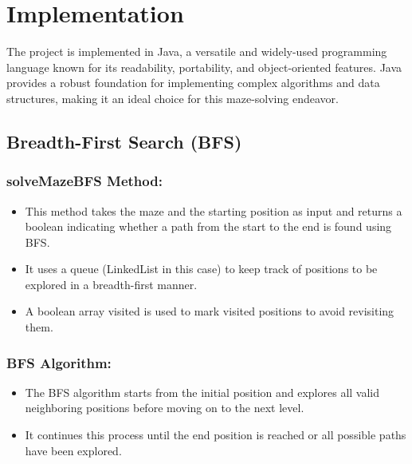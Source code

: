 \documentclass[12pt]{report}
\begin{document}
\section{Implementation}
The project is implemented in Java, a versatile and widely-used programming language known for its readability, portability, and object-oriented features. Java provides a robust foundation for implementing complex algorithms and data structures, making it an ideal choice for this maze-solving endeavor.



\subsection{Breadth-First Search (BFS)}
\subsubsection{solveMazeBFS Method:}

\begin{itemize}
    \item This method takes the maze and the starting position as input and returns a boolean indicating whether a path from the start to the end is found using BFS.
\end{itemize}

\begin{itemize}
    \item It uses a queue (LinkedList in this case) to keep track of positions to be explored in a breadth-first manner.
\end{itemize}

\begin{itemize}
    \item A boolean array visited is used to mark visited positions to avoid revisiting them.
\end{itemize}



\subsubsection{BFS Algorithm:}

\begin{itemize}
    \item The BFS algorithm starts from the initial position and explores all valid neighboring positions before moving on to the next level.
\end{itemize}

\begin{itemize}
    \item It continues this process until the end position is reached or all possible paths have been explored.
\end{itemize}
\end{document}
